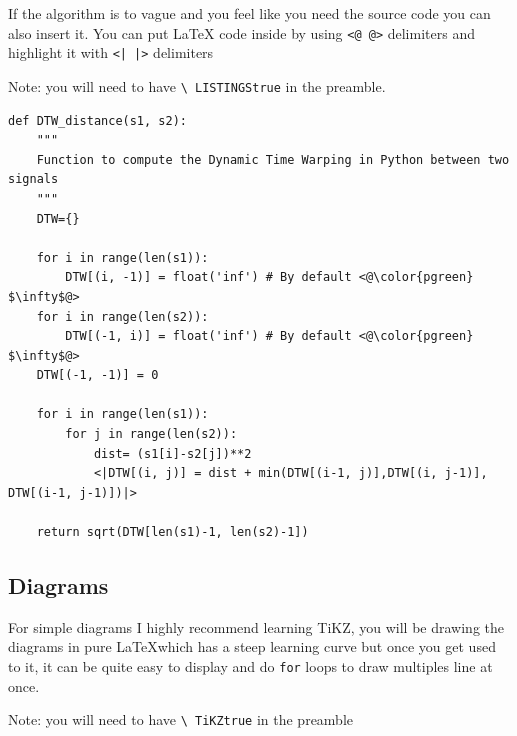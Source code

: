 \documentclass{project-logbook}
\begin{document}
{\begin{tip}
If the algorithm is to vague and you feel like you need the source code you can also insert it. You can put LaTeX code inside by using \texttt{<@ @>} delimiters and highlight it with \texttt{<| |>} delimiters

Note: you will need to have \texttt{\textbackslash
LISTINGStrue} in the preamble.
\end{tip}

\begin{lstlisting}[style=Python]
def DTW_distance(s1, s2):
	"""
	Function to compute the Dynamic Time Warping in Python between two signals
	"""
	DTW={}

	for i in range(len(s1)):
		DTW[(i, -1)] = float('inf') # By default <@\color{pgreen} $\infty$@>
	for i in range(len(s2)):
		DTW[(-1, i)] = float('inf') # By default <@\color{pgreen} $\infty$@>
	DTW[(-1, -1)] = 0

	for i in range(len(s1)):
		for j in range(len(s2)):
			dist= (s1[i]-s2[j])**2
			<|DTW[(i, j)] = dist + min(DTW[(i-1, j)],DTW[(i, j-1)], DTW[(i-1, j-1)])|>

	return sqrt(DTW[len(s1)-1, len(s2)-1])
\end{lstlisting}

\clearpage
\subsection{Diagrams} %
\label{sub:diagrams}

\begin{tip}
For simple diagrams I highly recommend learning TiKZ, you will be drawing the diagrams in pure \LaTeX which has a steep learning curve but once you get used to it, it can be quite easy to display and do \texttt{for} loops to draw multiples line at once.

Note: you will need to have \texttt{\textbackslash
TiKZtrue} in the preamble
\end{tip}

\begin{figure}[!h]
\centering
{}

\end{figure}}
\end{document}
